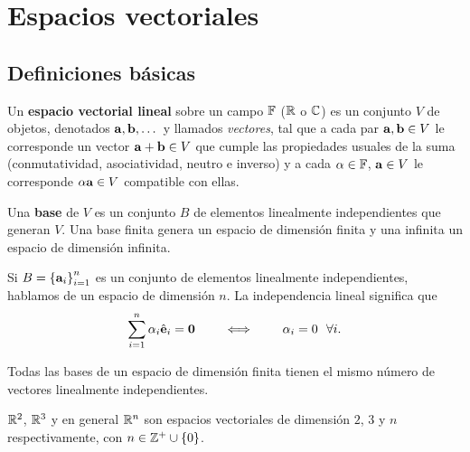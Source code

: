 \section{Espacios vectoriales}
\label{sec:espacios_vectoriales}

\subsection{Definiciones b\'asicas}
\label{subsec:definiciones_ev}

\begin{definicion}
  \label{def:espacio_vectorial}
  Un \textbf{espacio vectorial lineal} sobre un campo $\mathbb{F}$ ($\mathbb{R}$ o $\mathbb{C}$) es un
  conjunto $V$ de objetos, denotados $\mathbf{a},\mathbf{b},\dots$ y llamados
  \emph{vectores}, tal que a cada par $\mathbf{a},\mathbf{b}\in V$ le corresponde un
  vector $\mathbf{a}+\mathbf{b}\in V$ que cumple las propiedades usuales de la suma
  (conmutatividad, asociatividad, neutro e inverso) y a cada
  $\alpha\in\mathbb{F}$, $\mathbf{a}\in V$ le corresponde $\alpha\mathbf{a}\in V$ compatible con
  ellas.
\end{definicion}

\begin{definicion}[Base]
  \label{def:base}
  Una \textbf{base} de $V$ es un conjunto $B$ de elementos linealmente
  independientes que generan $V$. Una base finita genera un espacio de
  dimensi\'on finita y una infinita un espacio de dimensi\'on infinita.
\end{definicion}

Si $B=\left\{ \mathbf{a}_i \right\}_{i=1}^{n}$ es un conjunto de elementos linealmente
independientes, hablamos de un espacio de dimensi\'on $n$. La independencia
lineal significa que
\begin{equation}
  \label{eq:independencia_lineal}
  \sum_{i=1}^{n}\alpha_i\hat{\mathbf{e}}_i=\mathbf{0}
  \qquad\iff\qquad
  \alpha_i=0\ \ \forall i .
\end{equation}

\begin{teorema}
  \label{teo:dimension}
  Todas las bases de un espacio de dimensi\'on finita tienen el mismo n\'umero
  de vectores linealmente independientes.
\end{teorema}

\begin{ejemplo}
  \label{ej:espacios_finitos}
  $\mathbb{R}^2$, $\mathbb{R}^3$ y en general $\mathbb{R}^n$ son espacios vectoriales de dimensi\'on
  $2$, $3$ y $n$ respectivamente, con $n\in\mathbb{Z}^{+}\cup\left\{ 0 \right\}$.
\end{ejemplo}

